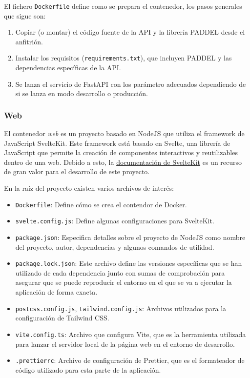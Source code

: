 El fichero \texttt{Dockerfile} define como se prepara el contenedor, los pasos
generales que sigue son:

\begin{enumerate}
    \item Copiar (o montar) el código fuente de la API y la librería PADDEL
          desde el anfitrión.
    \item Instalar los requisitos (\texttt{requirements.txt}), que incluyen
          PADDEL y las dependencias específicas de la API.
    \item Se lanza el servicio de FastAPI con los parámetro adecuados
          dependiendo de si se lanza en modo desarrollo o producción.
\end{enumerate}

\subsubsection{Web}

El contenedor \textit{web} es un proyecto basado en NodeJS que utiliza el
framework de JavaScript SvelteKit. Este framework está basado en Svelte, una
librería de JavaScript que permite la creación de componentes interactivos y
reutilizables dentro de una web. Debido a esto, la
\href{https://kit.svelte.dev/docs/introduction}{documentación de SvelteKit} es
un recurso de gran valor para el desarrollo de este proyecto.

En la raíz del proyecto existen varios archivos de interés:

\begin{itemize}
    \item \texttt{Dockerfile}: Define cómo se crea el contendor de Docker.
    \item \texttt{svelte.config.js}: Define algunas configuraciones para
    SvelteKit.
    \item \texttt{package.json}: Especifica detalles sobre el proyecto de NodeJS
          como nombre del proyecto, autor, dependencias y algunos comandos de
          utilidad.
    \item \texttt{package.lock.json}: Este archivo define las versiones
          específicas que se han utilizado de cada dependencia junto con sumas
          de comprobación para asegurar que se puede reproducir el entorno en el
          que se va a ejecutar la aplicación de forma exacta.
    \item \texttt{postcss.config.js}, \texttt{tailwind.config.js}: Archivos
          utilizados para la configuración de Tailwind CSS.
    \item \texttt{vite.config.ts}: Archivo que configura Vite, que es la
    herramienta utilizada para lanzar el servidor local de la página web en el
    entorno de desarrollo.
    \item \texttt{.prettierrc}: Archivo de configuración de Prettier, que es el
    formateador de código utilizado para esta parte de la aplicación.
\end{itemize}


